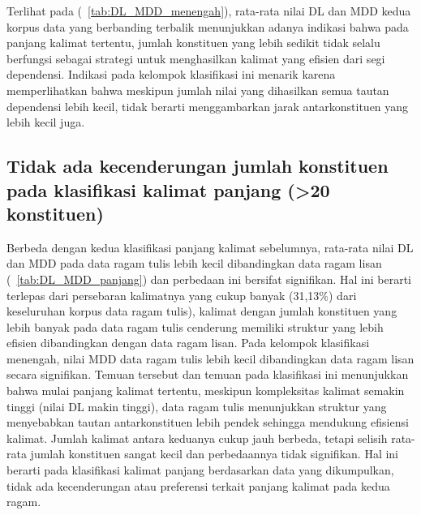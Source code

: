 Terlihat pada (\tab~\ref{tab:DL_MDD_menengah}), rata-rata nilai DL dan MDD kedua korpus data yang berbanding terbalik menunjukkan adanya indikasi bahwa pada panjang kalimat tertentu, jumlah konstituen yang lebih sedikit tidak selalu berfungsi sebagai strategi untuk menghasilkan kalimat yang efisien dari segi dependensi. Indikasi pada kelompok klasifikasi ini menarik karena memperlihatkan bahwa meskipun jumlah nilai yang dihasilkan semua tautan dependensi lebih kecil, tidak berarti menggambarkan jarak antarkonstituen yang lebih kecil juga.

\subsection{Tidak ada kecenderungan jumlah konstituen pada klasifikasi kalimat panjang (\textgreater20 konstituen)}

Berbeda dengan kedua klasifikasi panjang kalimat sebelumnya, rata-rata nilai DL dan MDD pada data ragam tulis lebih kecil dibandingkan data ragam lisan (\tab~\ref{tab:DL_MDD_panjang}) dan perbedaan ini bersifat signifikan. Hal ini berarti terlepas dari persebaran kalimatnya yang cukup banyak (31,13\%) dari keseluruhan korpus data ragam tulis), kalimat dengan jumlah konstituen yang lebih banyak pada data ragam tulis cenderung memiliki struktur yang lebih efisien dibandingkan dengan data ragam lisan. Pada kelompok klasifikasi menengah, nilai MDD data ragam tulis lebih kecil dibandingkan data ragam lisan secara signifikan. Temuan tersebut dan temuan pada klasifikasi ini menunjukkan bahwa mulai panjang kalimat tertentu, meskipun kompleksitas kalimat semakin tinggi (nilai DL makin tinggi), data ragam tulis menunjukkan struktur yang menyebabkan tautan antarkonstituen lebih pendek sehingga mendukung efisiensi kalimat. Jumlah kalimat antara keduanya cukup jauh berbeda, tetapi selisih rata-rata jumlah konstituen sangat kecil dan perbedaannya tidak signifikan. Hal ini berarti pada klasifikasi kalimat panjang berdasarkan data yang dikumpulkan, tidak ada kecenderungan atau preferensi terkait panjang kalimat pada kedua ragam. 


